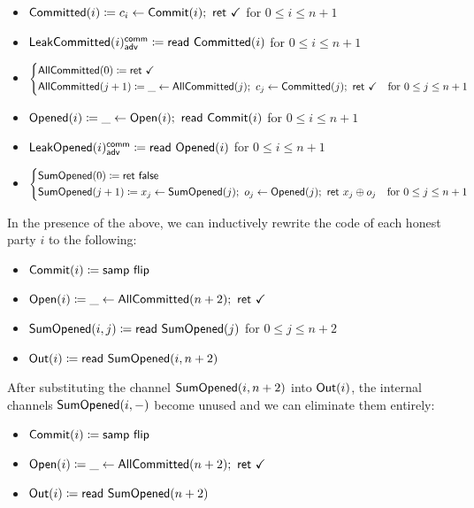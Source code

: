 \begin{itemize}
\item {\color{magenta} $\mathsf{Committed}(i) \coloneqq c_i \leftarrow \mathsf{Commit}(i); \ \mathsf{ret} \ \checkmark$ for $0 \leq i \leq n+1$}
\item {\color{magenta} $\mathsf{LeakCommitted}(i)^{\mathsf{comm}}_{\mathsf{adv}} \coloneqq \mathsf{read} \ \mathsf{Committed}(i)$ for $0 \leq i \leq n+1$}
\item {\color{magenta} $\begin{cases*} \AllCommitted(0) \coloneqq \ret{\checkmark} & \\ \AllCommitted(j+1) \coloneqq \_ \leftarrow \AllCommitted(j); \ c_j \leftarrow \Committed(j); \ \ret{\checkmark} & \text{for $0 \leq j \leq n+1$} \end{cases*}$}
\item {\color{red} $\mathsf{Opened}(i) \coloneqq \_ \leftarrow \mathsf{Open}(i); \ \mathsf{read} \ \mathsf{Commit}(i)$ for $0 \leq i \leq n+1$}
\item {\color{red} $\mathsf{LeakOpened}(i)^{\mathsf{comm}}_{\mathsf{adv}} \coloneqq \mathsf{read} \ \mathsf{Opened}(i)$ for $0 \leq i \leq n+1$}
\item {\color{red} $\begin{cases*} \SumOpened(0) \coloneqq \ret{\false} & \\ \SumOpened(j+1) \coloneqq x_j \leftarrow \SumOpened(j); \ o_j \leftarrow \Opened(j); \ \ret{x_j \oplus o_j} & \text{for $0 \leq j \leq n+1$} \end{cases*}$}
\end{itemize}

\noindent In the presence of the above, we can inductively rewrite the code of each honest party $i$ to the following:

\begin{itemize}
\item {\color{blue} $\mathsf{Commit}(i) \coloneqq \mathsf{samp} \ \mathsf{flip}$}
\item {\color{teal} $\Open(i) \coloneqq \_ \leftarrow \AllCommitted(n+2); \ \ret{\checkmark}$}
\item {\color{red} $\mathsf{SumOpened}(i,j) \coloneqq \mathsf{read} \ \mathsf{SumOpened}(j)$ for $0 \leq j \leq n+2$}
\item $\mathsf{Out}(i) \coloneqq \mathsf{read} \ \mathsf{SumOpened}(i,n+2)$
\end{itemize}

\noindent After substituting the channel $\mathsf{SumOpened}(i,n+2)$ into $\mathsf{Out}(i)$, the internal channels $\mathsf{SumOpened}(i,-)$ become unused and we can eliminate them entirely:

\begin{itemize}
\item {\color{blue} $\mathsf{Commit}(i) \coloneqq \mathsf{samp} \ \mathsf{flip}$}
\item {\color{teal} $\Open(i) \coloneqq \_ \leftarrow \AllCommitted(n+2); \ \ret{\checkmark}$}
\item $\mathsf{Out}(i) \coloneqq \mathsf{read} \ \mathsf{SumOpened}(n+2)$
\end{itemize}

